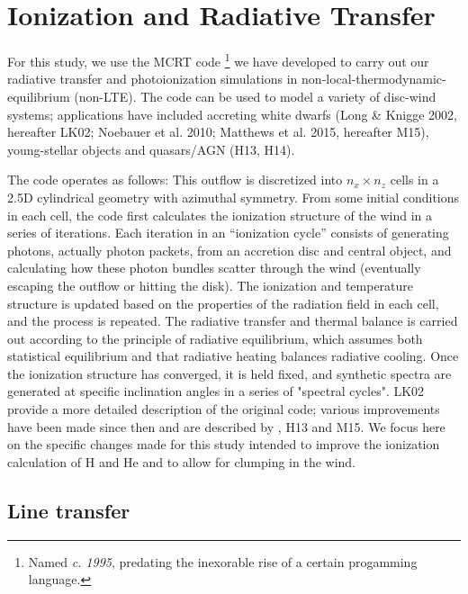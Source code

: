 \documentclass[useAMS,usenatbib]{mn2e_x}
\begin{document}



\section{Ionization and Radiative Transfer}

For this study, we use the MCRT code \py 
\footnote{Named {\sl c. 1995}, predating the inexorable rise of a certain progamming language.} we have developed to carry out our 
radiative transfer and photoionization simulations in non-local-thermodynamic-equilibrium 
(non-LTE). The code can be used to model a variety of
disc-wind systems; applications have included accreting white dwarfs 
(Long \& Knigge 2002, hereafter LK02; Noebauer et al. 2010; 
Matthews et al. 2015, hereafter M15), young-stellar objects 
\citep{simmacro2005} and quasars/AGN (H13, H14).\nocite{noebauer, M15, LK02}  

The code operates as follows:   This outflow is discretized into $n_x \times n_z$ cells in a 2.5D
cylindrical geometry with azimuthal symmetry. From some initial conditions in each cell, the code first calculates the ionization structure of the wind in a series of iterations.  Each iteration in an ``ionization cycle'' consists of generating photons, actually photon packets, 
from an accretion disc and central object, and calculating how these photon 
bundles scatter through the wind (eventually escaping the outflow or hitting the disk). 
The ionization and temperature structure is updated based on the properties of the 
radiation field in each cell, and the process is repeated. The radiative transfer and thermal
balance is carried out according to the principle of radiative equilibrium, 
which assumes both statistical equilibrium and that radiative heating balances radiative cooling.
Once the ionization structure has converged, it is held fixed, 
and synthetic spectra are generated at specific inclination 
angles in a series of "spectral cycles". LK02 provide a more detailed  
description of the original code; various improvements have been made 
since then and are described by \cite{simmacro2005}, H13 and M15.  
We focus here on the specific changes made for this study
intended to improve the ionization calculation of H and He
and to allow for clumping in the wind.


\subsection{Line transfer}
\end{document}
